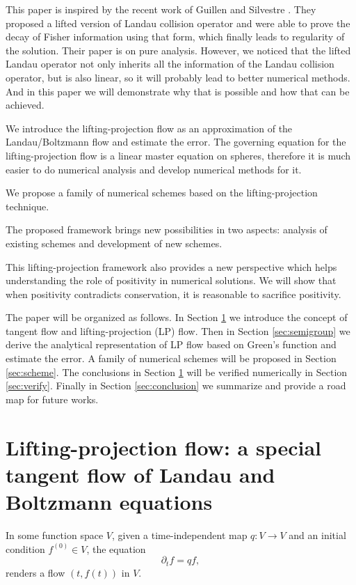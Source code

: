 \documentclass{article}
\numberwithin{equation}{section}
\begin{document}
This paper is inspired by the recent work of Guillen and Silvestre \cite{guillen2025landau}. They proposed a lifted version of Landau collision operator and were able to prove the decay of Fisher information using that form, which finally leads to regularity of the solution. Their paper \cite{guillen2025landau} is on pure analysis. However, we noticed that the lifted Landau operator not only inherits all the information of the Landau collision operator, but is also linear, so it will probably lead to better numerical methods. And in this paper we will demonstrate why that is possible and how that can be achieved.

We introduce the lifting-projection flow as an approximation of the Landau/Boltzmann flow and estimate the error. The governing equation for the lifting-projection flow is a linear master equation on spheres, therefore it is much easier to do numerical analysis and develop numerical methods for it. 

We propose a family of numerical schemes based on the lifting-projection technique.

The proposed framework brings new possibilities in two aspects: analysis of existing schemes and development of new schemes.

This lifting-projection framework also provides a new perspective which helps understanding the role of positivity in numerical solutions. We will show that when positivity contradicts conservation, it is reasonable to sacrifice positivity.

The paper will be organized as follows. In Section \ref{sec:tangent_flow} we introduce the concept of tangent flow and lifting-projection (LP) flow. Then in Section \ref{sec:semigroup} we derive the analytical representation of LP flow based on Green's function and estimate the error. A family of numerical schemes will be proposed in Section \ref{sec:scheme}. The conclusions in Section \ref{sec:tangent_flow} will be verified numerically in Section \ref{sec:verify}. Finally in Section \ref{sec:conclusion} we summarize and provide a road map for future works.

\section{Lifting-projection flow: a special tangent flow of Landau and Boltzmann equations}\label{sec:tangent_flow}

In some function space $V$, given a time-independent map $q:V\rightarrow V$ and an initial condition $f^{(0)} \in V$, the equation
\begin{equation*}
    \partial_{t}f = qf,
\end{equation*}
renders a flow $(t,f(t))$ in $V$. 
\end{document}

